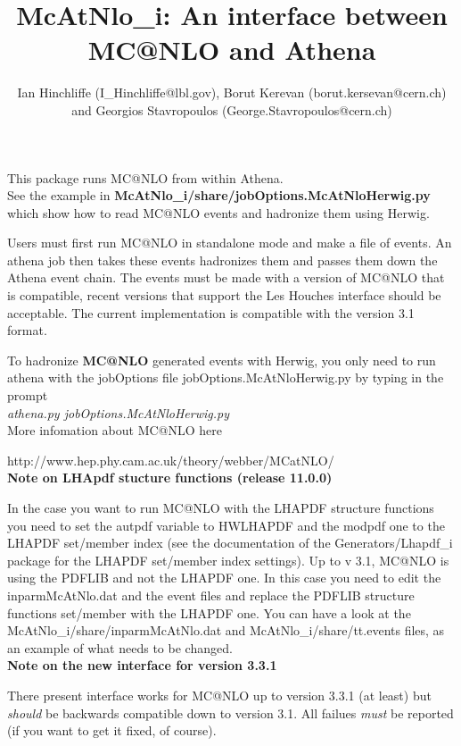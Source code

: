 \documentclass[11pt]{article}
\begin{document}
\title{McAtNlo\_i: An interface between MC@NLO and Athena}
\author{  Ian Hinchliffe (I\_Hinchliffe@lbl.gov), Borut Kerevan (borut.kersevan@cern.ch) and Georgios Stavropoulos (George.Stavropoulos@cern.ch) }

\maketitle           

This package runs MC@NLO  from within Athena. \\See the example
in {\bf McAtNlo\_i/share/jobOptions.McAtNloHerwig.py } which show how to
read MC@NLO events and hadronize them using Herwig.

Users must first run 
MC@NLO in standalone mode and make a file of events. An athena job
then takes these events hadronizes them and passes them down the
Athena event chain. The events must be made with a version of MC@NLO
that is compatible, recent versions that support the Les Houches
interface should be acceptable. The current implementation is compatible
with the version 3.1 format.

To hadronize {\bf MC@NLO} generated events with Herwig, you only need to run athena with the jobOptions
file jobOptions.McAtNloHerwig.py by typing in the prompt \\
{\it athena.py jobOptions.McAtNloHerwig.py}\\

More infomation about MC@NLO here

http://www.hep.phy.cam.ac.uk/theory/webber/MCatNLO/\\

{\large \bf Note on LHApdf stucture functions (release 11.0.0)}

In the case you want to run MC@NLO with the LHAPDF structure functions you need to
set the autpdf variable to HWLHAPDF and the modpdf one to the LHAPDF set/member index
(see the documentation of the Generators/Lhapdf\_i package for the LHAPDF set/member
index settings). Up to v 3.1, MC@NLO is using the PDFLIB and not the LHAPDF one. In this
case you need to edit the inparmMcAtNlo.dat and the event files and replace the PDFLIB
structure functions set/member with the LHAPDF one. You can have a look at the
McAtNlo\_i/share/inparmMcAtNlo.dat and McAtNlo\_i/share/tt.events files, as an example
of what needs to be changed.\\

{\large \bf Note on the new interface for version 3.3.1}
 
There present interface works for MC@NLO up to version 3.3.1 (at least) but \emph{should} be 
backwards compatible down to version 3.1. All failues \emph{must} be reported (if you want to get
it fixed, of course).
\end{document}
